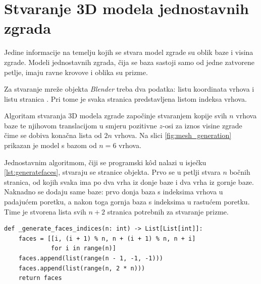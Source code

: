 \documentclass[times, utf8, zavrsni, numeric]{fer}
\begin{document}
	
	
	\section{Stvaranje 3D modela jednostavnih zgrada}
	
		Jedine informacije na temelju kojih se stvara model zgrade su oblik baze  i visina zgrade.
		Modeli jednostavnih zgrada, čija se baza sastoji samo od jedne zatvorene petlje, imaju ravne krovove i oblika su prizme.
		
		Za stvaranje mreže  objekta \textit{Blender} treba dva podatka: listu koordinata vrhova  i listu stranica .
		Pri tome je svaka stranica predstavljena listom indeksa vrhova.
		
		Algoritam stvaranja 3D modela zgrade započinje stvaranjem kopije svih $n$ vrhova baze te njihovom translacijom u smjeru pozitivne \mbox{$z$-osi} za iznos visine zgrade čime se dobiva konačna lista od $2n$ vrhova.
		Na slici \ref{fig:mesh_generation} prikazan je model s bazom od $n=6$ vrhova.
		
		Jednostavnim algoritmom, čiji se programski kôd nalazi u isječku \ref{lst:generatefaces}, stvaraju se stranice objekta.
		Prvo se u petlji stvara $n$ bočnih stranica, od kojih svaka ima po dva vrha iz donje baze i dva vrha iz gornje baze.
		Naknadno se dodaju same baze: prvo donja baza s indeksima vrhova u padajućem poretku, a nakon toga gornja baza s indeksima u rastućem poretku.
		Time je stvorena lista svih $n+2$ stranica potrebnih za stvaranje prizme.
	
		\begin{lstlisting}[caption={Isječak programskog kôda za stvaranje stranica 3D modela zgrade},label={lst:generatefaces},frame=L]
def _generate_faces_indices(n: int) -> List[List[int]]:
    faces = [[i, (i + 1) % n, n + (i + 1) % n, n + i]
             for i in range(n)]
    faces.append(list(range(n - 1, -1, -1)))
    faces.append(list(range(n, 2 * n)))
    return faces
		\end{lstlisting}
		
\end{document}
